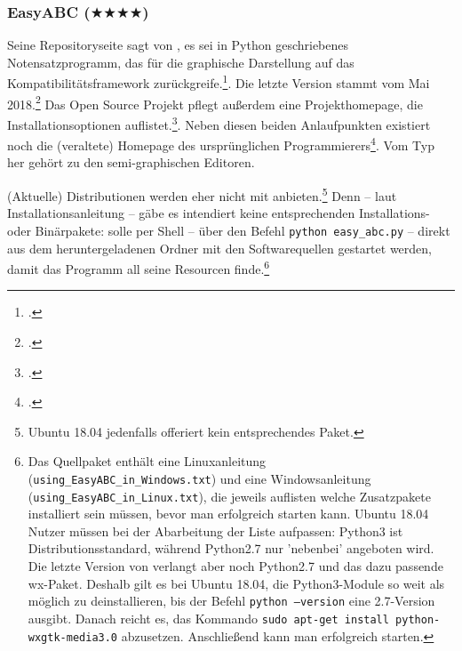 %
%
%



\subsubsection{EasyABC ($\bigstar\bigstar\bigstar\bigstar$)}

\label{EasyABC}Seine Repositoryseite sagt von , es sei in Python
geschriebenes Notensatzprogramm, das für die graphische Darstellung auf das
Kompatibilitätsframework  zurückgreife.\footcite[vgl.][\nopage
wp]{EasyAbc2017a}. Die letzte Version stammt vom Mai
2018.\footcite[vgl.][\nopage wp]{EasyAbc2017c} Das Open Source Projekt pflegt
außerdem eine Projekthomepage, die Installationsoptionen
auflistet.\footcite[vgl.][\nopage wp]{EasyAbc2017b}. Neben diesen beiden
Anlaufpunkten existiert noch die (veraltete) Homepage des ursprünglichen
Programmierers\footcite[vgl.][\nopage wp]{Liberg2015a}. Vom Typ her gehört
 zu den semi-graphischen Editoren.

(Aktuelle) Distributionen werden  eher nicht mit
anbieten.\footnote{Ubuntu 18.04 jedenfalls offeriert kein entsprechendes Paket.}
Denn -- laut  Installationsanleitung -- gäbe es intendiert keine
entsprechenden Installations- oder Binärpakete:  solle per Shell --
über den Befehl \texttt{python easy\_abc.py} -- direkt aus dem heruntergeladenen
Ordner mit den Softwarequellen gestartet werden, damit das Programm all seine
Resourcen finde.\footnote{Das Quellpaket enthält eine Linuxanleitung
(\texttt{using\_EasyABC\_in\_Windows.txt}) und eine Windowsanleitung
(\texttt{using\_EasyABC\_in\_Linux.txt}), die jeweils auflisten welche
Zusatzpakete installiert sein müssen, bevor man  erfolgreich
starten kann. Ubuntu 18.04 Nutzer müssen bei der Abarbeitung der Liste
aufpassen: Python3 ist Distributionsstandard, während Python2.7 nur 'nebenbei'
angeboten wird. Die letzte Version von  verlangt aber noch
Python2.7 und das dazu passende wx-Paket. Deshalb gilt es bei Ubuntu 18.04, die
Python3-Module so weit als möglich zu deinstallieren, bis der Befehl
\texttt{python --version} eine 2.7-Version ausgibt. Danach reicht es, das
Kommando \texttt{sudo apt-get install python-wxgtk-media3.0}
abzusetzen. Anschließend kann man  erfolgreich starten.}


